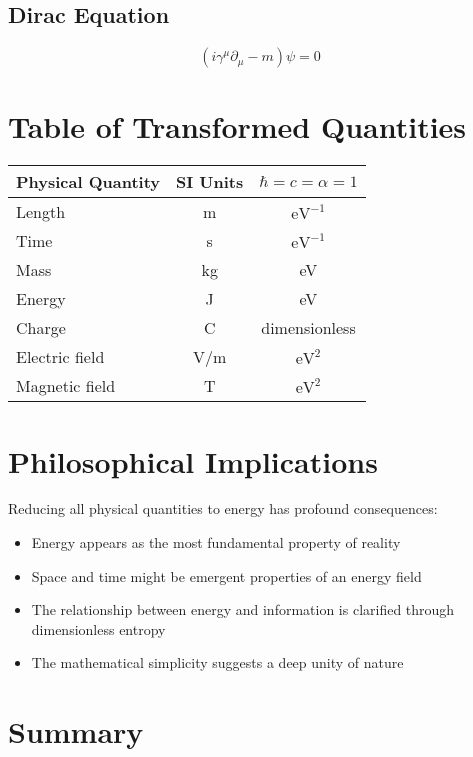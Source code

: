 \documentclass{article}
\begin{document}
	\subsection{Dirac Equation}
	\begin{equation}
		(i\gamma^\mu\partial_\mu - m)\psi = 0
	\end{equation}
	
	\section{Table of Transformed Quantities}
	
	\begin{center}
		\begin{tabular}{|l|c|c|}
			\hline
			\textbf{Physical Quantity} & \textbf{SI Units} & \textbf{$\hbar = c = \alpha = 1$} \\
			\hline
			Length & m & $\text{eV}^{-1}$ \\
			Time & s & $\text{eV}^{-1}$ \\
			Mass & kg & eV \\
			Energy & J & eV \\
			Charge & C & dimensionless \\
			Electric field & V/m & $\text{eV}^2$ \\
			Magnetic field & T & $\text{eV}^2$ \\
			\hline
		\end{tabular}
	\end{center}
	
	\section{Philosophical Implications}
	
	Reducing all physical quantities to energy has profound consequences:
	
	\begin{itemize}
		\item Energy appears as the most fundamental property of reality
		\item Space and time might be emergent properties of an energy field
		\item The relationship between energy and information is clarified through dimensionless entropy
		\item The mathematical simplicity suggests a deep unity of nature
	\end{itemize}
	
	\section{Summary}
	
\end{document}
